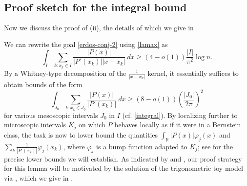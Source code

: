\documentclass[12pt]{amsart}
\newcommand{\R}{\mathbb{R}}
\begin{document}
\subsection{Proof sketch for the integral bound}

Now we discuss the proof of (ii), the details of which we give in .

We can rewrite the goal \eqref{erdos-conj-2} using \eqref{lamax} as
$$ \int_I \sum_{k: x_k \in I} \frac{|P(x)|}{|P'(x_k)| |x-x_k|}\ dx \geq (4-o(1)) \frac{|I|}{\pi^2} \log n.$$
By a Whitney-type decomposition of the $\frac{1}{|x-x_k|}$ kernel, it essentially suffices to obtain bounds of the form
$$ \int_{J_0} \sum_{k: x_k \in J_0} \frac{|P(x)|}{|P'(x_k)|}\ dx \geq (8-o(1)) \left( \frac{|J_0|}{2\pi} \right)^2$$
for various mesoscopic intervals $J_0$ in $I$ (cf. \eqref{integral}).  By localizing further to microscopic intervals $K_j$ on which $P$ behaves locally as if it were in a Bernstein class, the task is now to lower bound the quantities $\int_\R |P(x)| \varphi_j(x)$ and $\sum_k \frac{1}{|P'(x_k)|} \varphi_j(x_k)$, where $\varphi_j$ is a bump function adapted to $K_j$; see  for the precise lower bounds we will establish.  As indicated by  and , our proof strategy for this lemma will be motivated by the solution of the trigonometric toy model  via , which we give in .
\end{document}

